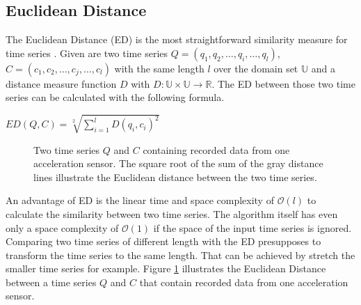 \subsection{Euclidean Distance}
The Euclidean Distance (ED) is the most straightforward similarity measure for time series \cite{ding2008querying}.
Given are two time series $Q = (q_1, q_2, \dots, q_i, \dots, q_l)$, $C = (c_1, c_2, \dots, c_j, \dots, c_l)$ with the
same length $l$ over the domain set $\mathbb{U}$ and a distance measure function $D$ with
$D: \mathbb{U} \times \mathbb{U} \to \mathbb{R}$. The ED between those two time series can be calculated with the
following formula.
\begin{center}
    $ED(Q, C) = \sqrt[2]{\sum \limits_{i=1}^{l} D(q_i, c_i)^2}$
\end{center}

\begin{figure}[H]
    \begin{center}
    \end{center}
    \caption{Two time series $Q$ and $C$ containing recorded data from one acceleration sensor. The square root of the
    sum of the gray distance lines illustrate the Euclidean distance between the two time series.}
    \label{fig:euclideandistance}
\end{figure}

An advantage of ED is the linear time and space complexity of $\mathcal{O}(l)$ to calculate the similarity between two
time series. The algorithm itself has even only a space complexity of $\mathcal{O}(1)$ if the space of the input time
series is ignored. Comparing two time series of different length with the ED presupposes to transform the time series
to the same length. That can be achieved by stretch the smaller time series for example. Figure
\ref{fig:euclideandistance} illustrates the Euclidean Distance between a time series $Q$ and $C$ that contain recorded
data from one acceleration sensor.
